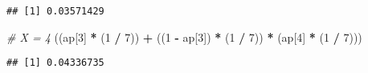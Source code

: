 \documentclass[
]{article}
\newenvironment{Shaded}{\begin{snugshade}}{\end{snugshade}}
\newcommand{\CommentTok}[1]{\textcolor[rgb]{0.56,0.35,0.01}{\textit{#1}}}
\newcommand{\DecValTok}[1]{\textcolor[rgb]{0.00,0.00,0.81}{#1}}
\newcommand{\NormalTok}[1]{#1}
\newcommand{\OperatorTok}[1]{\textcolor[rgb]{0.81,0.36,0.00}{\textbf{#1}}}
\newcommand{\StringTok}[1]{\textcolor[rgb]{0.31,0.60,0.02}{#1}}
\begin{document}
\begin{verbatim}
## [1] 0.03571429
\end{verbatim}

\begin{Shaded}
\begin{Highlighting}[]
\CommentTok{# X = 4}
\NormalTok{((ap[}\DecValTok{3}\NormalTok{] }\OperatorTok{*}\StringTok{ }\NormalTok{(}\DecValTok{1} \OperatorTok{/}\StringTok{ }\DecValTok{7}\NormalTok{)) }\OperatorTok{+}\StringTok{ }\NormalTok{((}\DecValTok{1} \OperatorTok{-}\StringTok{ }\NormalTok{ap[}\DecValTok{3}\NormalTok{]) }\OperatorTok{*}\StringTok{ }\NormalTok{(}\DecValTok{1} \OperatorTok{/}\StringTok{ }\DecValTok{7}\NormalTok{)) }\OperatorTok{*}\StringTok{ }\NormalTok{(ap[}\DecValTok{4}\NormalTok{] }\OperatorTok{*}\StringTok{ }\NormalTok{(}\DecValTok{1} \OperatorTok{/}\StringTok{ }\DecValTok{7}\NormalTok{)))}
\end{Highlighting}
\end{Shaded}

\begin{verbatim}
## [1] 0.04336735
\end{verbatim}
\end{document}
